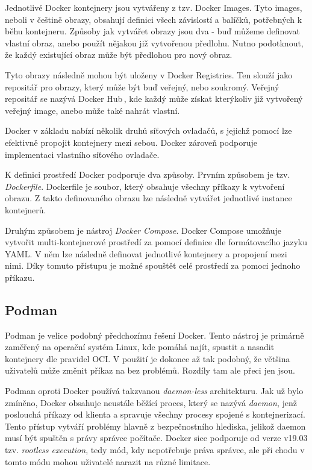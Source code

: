 Jednotlivé Docker kontejnery jsou vytvářeny z tzv. Docker Images. Tyto images, neboli v češtině obrazy, obsahují definici všech závislostí a balíčků, potřebných k běhu kontejneru. Způsoby jak vytvářet obrazy jsou dva - buď můžeme definovat vlastní obraz, anebo použít nějakou již vytvořenou předlohu. Nutno podotknout, že každý existující obraz může být předlohou pro nový obraz.\,\cite{turnbull2014docker}

Tyto obrazy následně mohou být uloženy v Docker Registries. Ten slouží jako repositář pro obrazy, který může být buď veřejný, nebo soukromý. Veřejný repositář se nazývá Docker Hub\,\cite{docker_hub}, kde každý může získat kterýkoliv již vytvořený veřejný image, anebo může také nahrát vlastní.\,\cite{turnbull2014docker} 

Docker v základu nabízí několik druhů síťových ovladačů, s jejichž pomocí lze efektivně propojit kontejnery mezi sebou. Docker zároveň podporuje implementaci vlastního síťového ovladače.\,\cite{docker_networking_overview}

K definici prostředí Docker podporuje dva způsoby. Prvním způsobem je tzv. \textit{Dockerfile}. Dockerfile je soubor, který obsahuje všechny příkazy k vytvoření obrazu. Z takto definovaného obrazu lze následně vytvářet jednotlivé instance kontejnerů.\,\cite{dockerfile}

Druhým způsobem je nástroj \textit{Docker Compose}. Docker Compose umožňuje vytvořit multi-kontejnerové prostředí za pomocí definice dle formátovacího jazyku YAML. V něm lze následně definovat jednotlivé kontejnery a propojení mezi nimi. Díky tomuto přístupu je možné spouštět celé prostředí za pomoci jednoho příkazu.\,\cite{dockercompose}


\subsection{Podman}
Podman je velice podobný předchozímu řešení Docker. Tento nástroj je primárně zaměřený na operační systém Linux, kde pomáhá najít, spustit a nasadit kontejnery dle pravidel OCI. V použití je dokonce až tak podobný, že většina uživatelů může změnit příkaz  na  bez problémů. Rozdíly tam ale přeci jen jsou.\,\cite{podman}\cite{podman_vs_docker}

Podman oproti Docker používá takzvanou \textit{daemon-less} architekturu. Jak už bylo zmíněno, Docker obsahuje neustále běžící proces, který se nazývá \textit{daemon}, jenž poslouchá příkazy od klienta a spravuje všechny procesy spojené s kontejnerizací. Tento přístup vytváří problémy hlavně z bezpečnostního hlediska, jelikož daemon musí být spuštěn s právy správce počítače. Docker sice podporuje od verze v19.03 tzv. \textit{rootless execution}, tedy mód, kdy nepotřebuje práva správce, ale při chodu v tomto módu mohou uživatelé narazit na různé limitace.\,\cite{podman_vs_docker}

